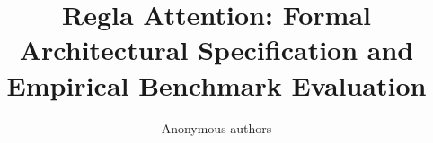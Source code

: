 \title{\textbf{Regla Attention: Formal Architectural Specification and Empirical Benchmark Evaluation}}

\author{Anonymous authors}
